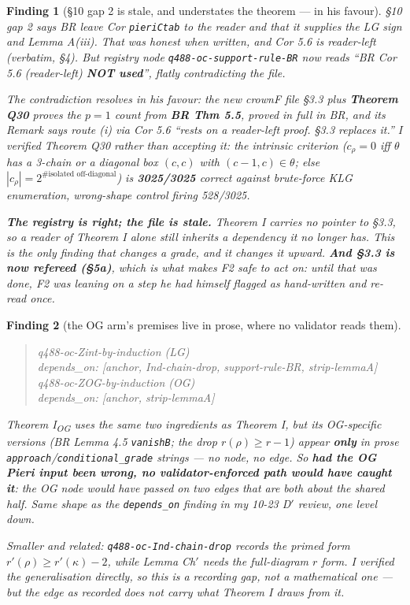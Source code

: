 \documentclass[11pt,a4paper]{article}
\newtheorem{finding}{Finding}
\theoremstyle{remark}
\begin{document}
\begin{finding}[\S10 gap 2 is stale, and understates the theorem --- in his favour]
\S10 gap 2 says BR leave Cor \texttt{pieriCtab} to the reader and that it supplies the LG sign
and Lemma A(iii). That was honest when written, and Cor 5.6 \emph{is} reader-left (verbatim,
\S4). But registry node \texttt{q488-oc-support-rule-BR} now reads ``BR Cor 5.6 (reader-left)
\textbf{NOT used}'', flatly contradicting the file.

The contradiction resolves in his favour: the new crownF file \S3.3 plus \textbf{Theorem Q30}
proves the $p=1$ count from \textbf{BR Thm 5.5}, proved in full in BR, and its Remark says route
(i) via Cor 5.6 ``rests on a reader-left proof. \S3.3 replaces it.'' I verified Theorem Q30
rather than accepting it: the intrinsic criterion ($c_\rho=0$ iff $\theta$ has a 3-chain or a
diagonal box $(c,c)$ with $(c-1,c)\in\theta$; else $|c_\rho|=2^{\#\text{isolated off-diagonal}}$)
is \textbf{3025/3025} correct against brute-force KLG enumeration, wrong-shape control firing
528/3025.

\textbf{The registry is right; the file is stale.} Theorem I carries no pointer to \S3.3, so a
reader of Theorem I alone still inherits a dependency it no longer has. This is the only finding
that changes a grade, and it changes it \emph{upward}. \textbf{And \S3.3 is now refereed
(\S5a)}, which is what makes F2 safe to act on: until that was done, F2 was leaning on a step he
had himself flagged as hand-written and re-read once.
\end{finding}

\begin{finding}[the OG arm's premises live in prose, where no validator reads them]
\begin{quote}\small\ttfamily
q488-oc-Zint-by-induction (LG)\\
\hspace*{2em}depends\_on: [anchor, Ind-chain-drop, support-rule-BR, strip-lemmaA]\\[2pt]
q488-oc-ZOG-by-induction (OG)\\
\hspace*{2em}depends\_on: [anchor, strip-lemmaA]
\end{quote}
Theorem I\textsubscript{OG} uses the same two ingredients as Theorem I, but its
\emph{OG-specific} versions (BR Lemma 4.5 \texttt{vanishB}; the drop $r(\rho)\ge r-1$) appear
\textbf{only} in prose \texttt{approach}/\texttt{conditional\_grade} strings --- no node, no
edge. So \textbf{had the OG Pieri input been wrong, no validator-enforced path would have caught
it}: the OG node would have passed on two edges that are both about the shared half. Same shape
as the \texttt{depends\_on} finding in my 10-23 D$'$ review, one level down.

Smaller and related: \texttt{q488-oc-Ind-chain-drop} records the \emph{primed} form
$r'(\rho)\ge r'(\kappa)-2$, while Lemma Ch$'$ needs the \emph{full-diagram} $r$ form. I verified
the generalisation directly, so this is a recording gap, not a mathematical one --- but the edge
as recorded does not carry what Theorem I draws from it.
\end{finding}
\end{document}
